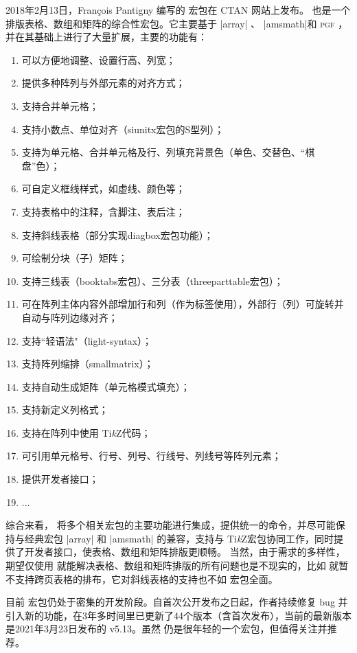 \documentclass[dvipsnames]{article}%
\def\tikzname{Ti\emph{k}Z}
\begin{document}
2018年2月13日，François Pantigny 编写的  宏包在 CTAN 网站上发布。
 也是一个排版表格、数组和矩阵的综合性宏包。它主要基于 |array| 、 |amsmath|和 \textsc{pgf} ，并在其基础上进行了大量扩展，主要的功能有：

\begin{enumerate}[label = \textbullet ]
  \item 可以方便地调整、设置行高、列宽；
  \item 提供多种阵列与外部元素的对齐方式；
  \item 支持合并单元格；
  \item 支持小数点、单位对齐（siunitx宏包的S型列）；
  \item 支持为单元格、合并单元格及行、列填充背景色（单色、交替色、“棋盘”色）；
  \item 可自定义框线样式，如虚线、颜色等；
  \item 支持表格中的注释，含脚注、表后注；
  \item 支持斜线表格（部分实现diagbox宏包功能）；
  \item 可绘制分块（子）矩阵；
  \item 支持三线表（booktabs宏包）、三分表（threeparttable宏包）；
  \item 可在阵列主体内容外部增加行和列（作为标签使用），外部行（列）可旋转并自动与阵列边缘对齐；
  \item 支持“轻语法"（light-syntax）；
  \item 支持阵列缩排（smallmatrix）；
  \item 支持自动生成矩阵（单元格模式填充）；
  \item 支持新定义列格式；
  \item 支持在阵列中使用 \tikzname 代码；
  \item 可引用单元格号、行号、列号、行线号、列线号等阵列元素；
  \item 提供开发者接口；
  \item ...
\end{enumerate}

综合来看，  将多个相关宏包的主要功能进行集成，提供统一的命令，并尽可能保持与经典宏包 |array| 和 |amsmath| 的兼容，支持与 \tikzname 宏包协同工作，同时提供了开发者接口，使表格、数组和矩阵排版更顺畅。 当然，由于需求的多样性，期望仅使用  就能解决表格、数组和矩阵排版的所有问题也是不现实的，比如  就暂不支持跨页表格的排布，它对斜线表格的支持也不如  宏包全面。

目前  宏包仍处于密集的开发阶段。自首次公开发布之日起，作者持续修复 bug 并引入新的功能，在3年多时间里已更新了44个版本（含首次发布），当前的最新版本是2021年3月23日发布的 v5.13。虽然  仍是很年轻的一个宏包，但值得关注并推荐。
\end{document}
